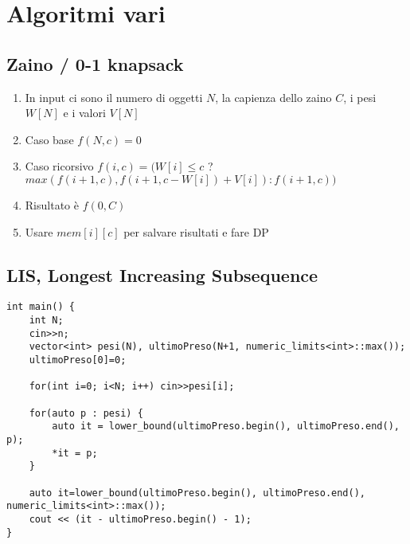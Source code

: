 \section{Algoritmi vari}

\subsection{Zaino / 0-1 knapsack}
\begin{enumerate}
    \item In input ci sono il numero di oggetti $N$, la capienza dello zaino $C$, i pesi $W[N]$ e i valori $V[N]$
    \item Caso base $f(N,c) = 0$
    \item Caso ricorsivo $f(i,c) = (W[i] \leq c$ ? $max(f(i+1, c), f(i+1, c-W[i]) + V[i]) : f(i+1, c))$
    \item Risultato è $f(0,C)$
    \item Usare $mem[i][c]$ per salvare risultati e fare DP
\end{enumerate}

\subsection{LIS, Longest Increasing Subsequence}
\begin{lstlisting}
int main() {
    int N;
    cin>>n;
    vector<int> pesi(N), ultimoPreso(N+1, numeric_limits<int>::max());
    ultimoPreso[0]=0;

    for(int i=0; i<N; i++) cin>>pesi[i];

    for(auto p : pesi) {
        auto it = lower_bound(ultimoPreso.begin(), ultimoPreso.end(), p);
        *it = p;
    }

    auto it=lower_bound(ultimoPreso.begin(), ultimoPreso.end(), numeric_limits<int>::max());
    cout << (it - ultimoPreso.begin() - 1);
}
\end{lstlisting}

